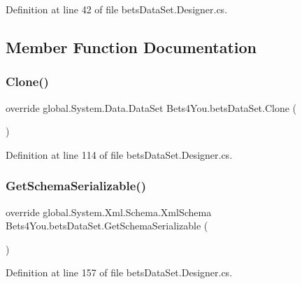 Definition at line 42 of file bets\+Data\+Set.\+Designer.\+cs.



\subsection{Member Function Documentation}
\mbox{\label{class_bets4_you_1_1bets_data_set_a11a851cbfdb2cbf028ed20f83f71d8f0}} 
\subsubsection{\texorpdfstring{Clone()}{Clone()}}
{\footnotesize\ttfamily override global.\+System.\+Data.\+Data\+Set Bets4\+You.\+bets\+Data\+Set.\+Clone (\begin{DoxyParamCaption}{ }\end{DoxyParamCaption})}



Definition at line 114 of file bets\+Data\+Set.\+Designer.\+cs.

\mbox{\label{class_bets4_you_1_1bets_data_set_a7711e3b70244060e65eafd97533353c4}} 
\subsubsection{\texorpdfstring{GetSchemaSerializable()}{GetSchemaSerializable()}}
{\footnotesize\ttfamily override global.\+System.\+Xml.\+Schema.\+Xml\+Schema Bets4\+You.\+bets\+Data\+Set.\+Get\+Schema\+Serializable (\begin{DoxyParamCaption}{ }\end{DoxyParamCaption})\hspace{0.3cm}{\ttfamily [protected]}}



Definition at line 157 of file bets\+Data\+Set.\+Designer.\+cs.

\mbox{\label{class_bets4_you_1_1bets_data_set_a9a81227ed6b6258ae9c076d9fdb25077}} 
